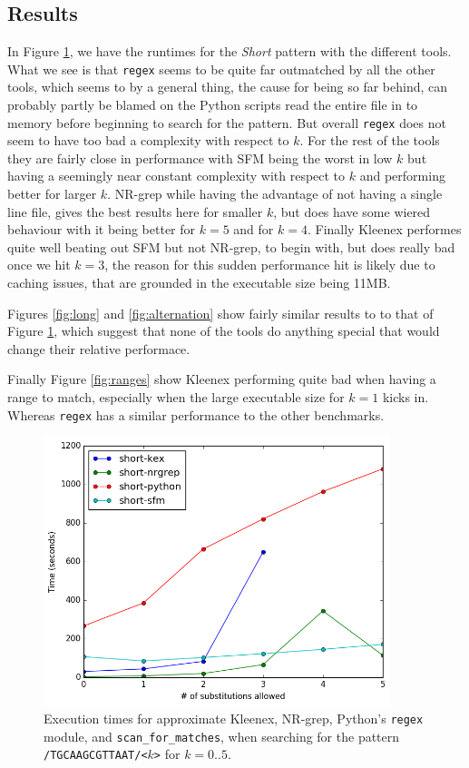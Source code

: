 \subsection{Results}
In Figure \ref{fig:short}, we have the runtimes for the \textit{Short} pattern
with the different tools. What we see is that \texttt{regex} seems to be quite
far outmatched by all the other tools, which seems to by a general thing, the
cause for being so far behind, can probably partly be blamed on the Python
scripts read the entire file in to memory before beginning to search for the
pattern. But overall \texttt{regex} does not seem to have too bad a complexity
with respect to $k$. For the rest of the tools they are fairly close in
performance with SFM being the worst in low $k$ but having a seemingly near
constant complexity with respect to $k$ and performing better for larger $k$.
NR-grep while having the advantage of not having a single line file, gives the
best results here for smaller $k$, but does have some wiered behaviour with it
being better for $k=5$ and for $k=4$. Finally Kleenex performes quite well
beating out SFM but not NR-grep, to begin with, but does really bad once we hit
$k=3$, the reason for this sudden performance hit is likely due to caching
issues, that are grounded in the executable size being 11MB.

Figures \ref{fig:long} and \ref{fig:alternation} show fairly similar results to
to that of Figure \ref{fig:short}, which suggest that none of the tools do
anything special that would change their relative performace.

Finally Figure \ref{fig:ranges} show Kleenex performing quite bad when having a
range to match, especially when the large executable size for $k=1$ kicks in.
Whereas \texttt{regex} has a similar performance to the other benchmarks.

\begin{figure}[!ht]
  \centering
  \includegraphics[width=0.9\textwidth]{images/short.png}
  \caption{Execution times for approximate Kleenex, NR-grep, Python's
    \texttt{regex} module, and \texttt{scan\_for\_matches}, when searching for
    the pattern \texttt{/TGCAAGCGTTAAT/<$k$>} for $k=0..5$.}
  \label{fig:short}
\end{figure}


